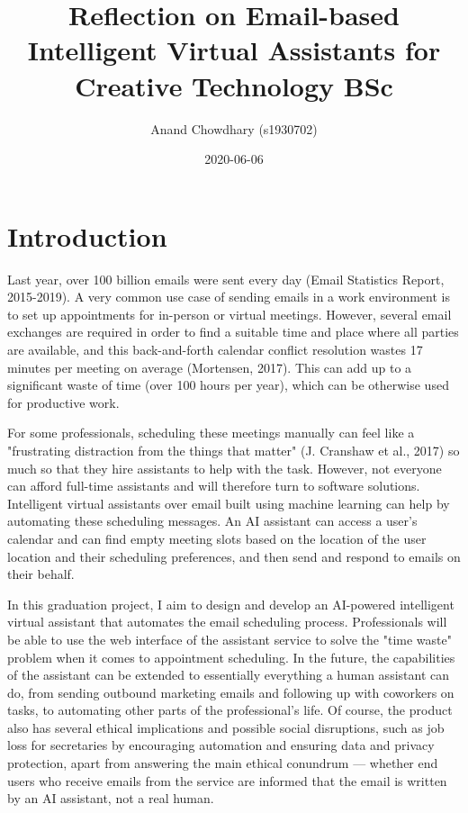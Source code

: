 \documentclass{article}
\title{Reflection on Email-based Intelligent Virtual Assistants for Creative Technology BSc}
\date{2020-06-06}
\author{Anand Chowdhary (s1930702)}
\begin{document}
  \maketitle
  \tableofcontents
  \newpage

\section{Introduction}

Last year, over 100 billion emails were sent every day (Email Statistics Report, 2015-2019). A very common use case of sending emails in a work environment is to set up appointments for in-person or virtual meetings. However, several email exchanges are required in order to find a suitable time and place where all parties are available, and this back-and-forth calendar conflict resolution wastes 17 minutes per meeting on average (Mortensen, 2017). This can add up to a significant waste of time (over 100 hours per year), which can be otherwise used for productive work.

For some professionals, scheduling these meetings manually can feel like a "frustrating distraction from the things that matter" (J. Cranshaw et al., 2017) so much so that they hire assistants to help with the task. However, not everyone can afford full-time assistants and will therefore turn to software solutions. Intelligent virtual assistants over email built using machine learning can help by automating these scheduling messages. An AI assistant can access a user’s calendar and can find empty meeting slots based on the location of the user location and their scheduling preferences, and then send and respond to emails on their behalf.

In this graduation project, I aim to design and develop an AI-powered intelligent virtual assistant that automates the email scheduling process. Professionals will be able to use the web interface of the assistant service to solve the "time waste" problem when it comes to appointment scheduling. In the future, the capabilities of the assistant can be extended to essentially everything a human assistant can do, from sending outbound marketing emails and following up with coworkers on tasks, to automating other parts of the professional’s life. Of course, the product also has several ethical implications and possible social disruptions, such as job loss for secretaries by encouraging automation and ensuring data and privacy protection, apart from answering the main ethical conundrum — whether end users who receive emails from the service are informed that the email is written by an AI assistant, not a real human.
\end{document}
